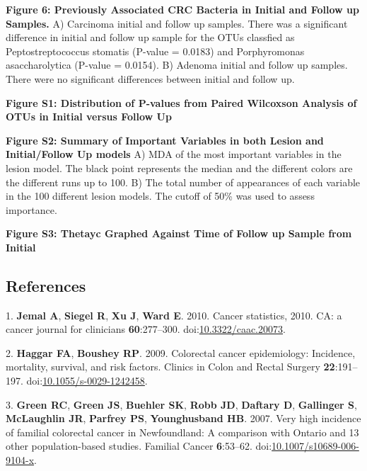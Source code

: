 \documentclass[12pt,]{article}
\begin{document}
\textbf{Figure 6: Previously Associated CRC Bacteria in Initial and
Follow up Samples.} A) Carcinoma initial and follow up samples. There
was a significant difference in initial and follow up sample for the
OTUs classfied as Peptostreptococcus stomatis (P-value = 0.0183) and
Porphyromonas asaccharolytica (P-value = 0.0154). B) Adenoma initial and
follow up samples. There were no significant differences between initial
and follow up.

\newpage

\textbf{Figure S1: Distribution of P-values from Paired Wilcoxson
Analysis of OTUs in Initial versus Follow Up}

\textbf{Figure S2: Summary of Important Variables in both Lesion and
Initial/Follow Up models} A) MDA of the most important variables in the
lesion model. The black point represents the median and the different
colors are the different runs up to 100. B) The total number of
appearances of each variable in the 100 different lesion models. The
cutoff of 50\% was used to assess importance.

\textbf{Figure S3: Thetayc Graphed Against Time of Follow up Sample from
Initial}

\newpage

\subsection*{References}\label{references}

\hypertarget{refs}{}
\hypertarget{ref-jemal_cancer_2010}{}
1. \textbf{Jemal A}, \textbf{Siegel R}, \textbf{Xu J}, \textbf{Ward E}.
2010. Cancer statistics, 2010. CA: a cancer journal for clinicians
\textbf{60}:277--300.
doi:\href{https://doi.org/10.3322/caac.20073}{10.3322/caac.20073}.

\hypertarget{ref-haggar_colorectal_2009}{}
2. \textbf{Haggar FA}, \textbf{Boushey RP}. 2009. Colorectal cancer
epidemiology: Incidence, mortality, survival, and risk factors. Clinics
in Colon and Rectal Surgery \textbf{22}:191--197.
doi:\href{https://doi.org/10.1055/s-0029-1242458}{10.1055/s-0029-1242458}.

\hypertarget{ref-green_very_2007}{}
3. \textbf{Green RC}, \textbf{Green JS}, \textbf{Buehler SK},
\textbf{Robb JD}, \textbf{Daftary D}, \textbf{Gallinger S},
\textbf{McLaughlin JR}, \textbf{Parfrey PS}, \textbf{Younghusband HB}.
2007. Very high incidence of familial colorectal cancer in Newfoundland:
A comparison with Ontario and 13 other population-based studies.
Familial Cancer \textbf{6}:53--62.
doi:\href{https://doi.org/10.1007/s10689-006-9104-x}{10.1007/s10689-006-9104-x}.
\end{document}
